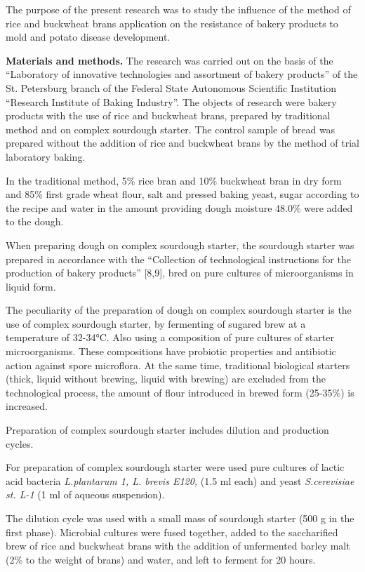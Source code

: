 \begin{multicols}{2}
The purpose of the present research was to study the influence of the
method of rice and buckwheat brans application on the resistance of
bakery products to mold and potato disease development.

{\bfseries Materials and methods.} The research was carried out on the
basis of the ``Laboratory of innovative technologies and assortment of
bakery products'' of the St. Petersburg branch of the Federal State
Autonomous Scientific Institution ``Research Institute of Baking
Industry''. The objects of research were bakery products with the use of
rice and buckwheat brans, prepared by traditional method and on complex
sourdough starter. The control sample of bread was prepared without the
addition of rice and buckwheat brans by the method of trial laboratory
baking.

In the traditional method, 5\% rice bran and 10\% buckwheat bran in dry
form and 85\% first grade wheat flour, salt and pressed baking yeast,
sugar according to the recipe and water in the amount providing dough
moisture 48.0\% were added to the dough.

When preparing dough on complex sourdough starter, the sourdough starter
was prepared in accordance with the ``Collection of technological
instructions for the production of bakery products'' {[}8,9{]}, bred on
pure cultures of microorganisms in liquid form.

The peculiarity of the preparation of dough on complex sourdough starter
is the use of complex sourdough starter, by fermenting of sugared brew
at a temperature of 32-34°C. Also using a composition of pure cultures
of starter microorganisms. These compositions have probiotic properties
and antibiotic action against spore microflora. At the same time,
traditional biological starters (thick, liquid without brewing, liquid
with brewing) are excluded from the technological process, the amount of
flour introduced in brewed form (25-35\%) is increased.

Preparation of complex sourdough starter includes dilution and
production cycles.

For preparation of complex sourdough starter were used pure cultures of
lactic acid bacteria \emph{L.plantarum 1, L. brevis E120,} (1.5 ml each)
and yeast \emph{S.cerevisiae st. L-1} (1 ml of aqueous suspension).

The dilution cycle was used with a small mass of sourdough starter (500
g in the first phase). Microbial cultures were fused together, added to
the saccharified brew of rice and buckwheat brans with the addition of
unfermented barley malt (2\% to the weight of brans) and water, and left
to ferment for 20 hours.


\end{multicols}
